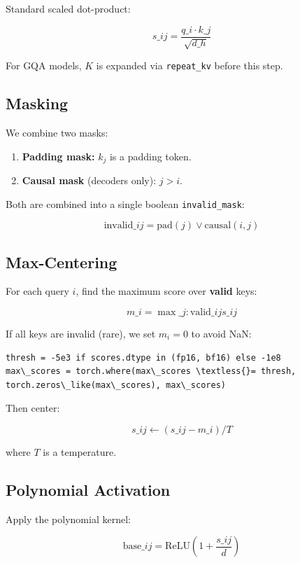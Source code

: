 Standard scaled dot-product:

\[
s\_{ij} = \frac{q\_i \cdot k\_j}{\sqrt{d\_h}}
\tag{4.1}
\]

For GQA models, $K$ is expanded via \texttt{repeat\_kv} before this step.

\subsection{Masking}

We combine two masks:

\begin{enumerate}
\item \textbf{Padding mask:} $k_j$ is a padding token.
\item \textbf{Causal mask} (decoders only): $j > i$.

\end{enumerate}
Both are combined into a single boolean \texttt{invalid\_mask}:

\[
\text{invalid}\_{ij} = \text{pad}(j) \lor \text{causal}(i, j)
\tag{4.2}
\]

\subsection{Max-Centering}

For each query $i$, find the maximum score over \textbf{valid} keys:

\[
m\_i = \max\_{j: \text{valid}\_{ij}} s\_{ij}
\tag{4.3}
\]

If all keys are invalid (rare), we set $m_i = 0$ to avoid NaN:

\begin{lstlisting}
thresh = -5e3 if scores.dtype in (fp16, bf16) else -1e8
max\_scores = torch.where(max\_scores \textless{}= thresh, torch.zeros\_like(max\_scores), max\_scores)
\end{lstlisting}

Then center:

\[
s\_{ij} \leftarrow (s\_{ij} - m\_i) / T
\tag{4.4}
\]

where $T$ is a temperature.

\subsection{Polynomial Activation}

Apply the polynomial kernel:

\[
\text{base}\_{ij} = \text{ReLU}\!\left(1 + \frac{s\_{ij}}{d}\right)
\tag{4.5}
\]

